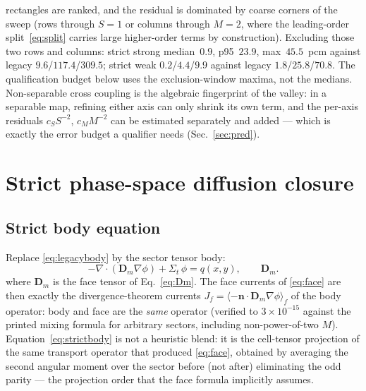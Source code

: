 \documentclass[11pt,a4paper]{article}
\begin{document}
rectangles are ranked, and the residual is dominated by coarse
corners of the sweep (rows through $S{=}1$ or columns through
$M{=}2$, where the leading-order split~\eqref{eq:split} carries large
higher-order terms by construction).  Excluding those two rows and
columns: strict strong median~$0.9$, p95~$23.9$, max~$45.5$~pcm
against legacy $9.6$/$117.4$/$309.5$; strict weak
$0.2$/$4.4$/$9.9$ against legacy $1.8$/$25.8$/$70.8$.  The
qualification budget below uses the exclusion-window maxima, not the
medians.  Non-separable cross
coupling is the algebraic fingerprint of the valley: in a separable
map, refining either axis can only shrink its own term, and the
per-axis residuals $c_S S^{-2}$, $c_M M^{-2}$ can be estimated
separately and added --- which is exactly the error budget a
qualifier needs (Sec.~\ref{sec:pred}).

\section{Strict phase-space diffusion closure}
\label{sec:strict}

\subsection{Strict body equation}
Replace \eqref{eq:legacybody} by the sector tensor body:
\begin{equation}
-\nabla\!\cdot\!\left(\bm{D}_m \nabla\phi\right)
+ \Sigma_t\,\phi = q(x,y),
\qquad \bm{D}_m.
\label{eq:strictbody}
\end{equation}
where $\bm{D}_m$ is the face tensor of Eq.~\ref{eq:Dm}.
The face currents of \eqref{eq:face} are then exactly the
divergence-theorem currents $J_f = \langle -\bm{n}\!\cdot\!\bm{D}_m
\nabla\phi\rangle_f$ of the body operator: body and face are the
\emph{same} operator (verified to $3\times10^{-15}$ against the printed
mixing formula for arbitrary sectors, including non-power-of-two $M$).
Equation~\eqref{eq:strictbody} is not a heuristic blend: it is the
cell-tensor projection of the same transport operator that produced
\eqref{eq:face}, obtained by averaging the second angular moment over
the sector before (not after) eliminating the odd parity --- the
projection order that the face formula implicitly assumes.
\end{document}
